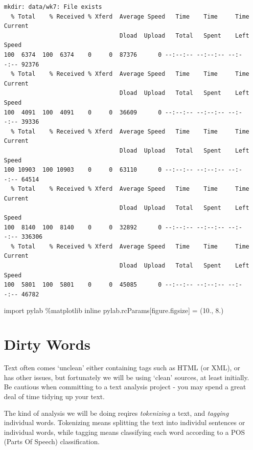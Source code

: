 \documentclass[
  letterpaper,
  DIV=11,
  numbers=noendperiod]{scrreprt}
\newenvironment{Shaded}{\begin{snugshade}}{\end{snugshade}}
\newcommand{\FloatTok}[1]{\textcolor[rgb]{0.68,0.00,0.00}{#1}}
\newcommand{\ImportTok}[1]{\textcolor[rgb]{0.00,0.46,0.62}{#1}}
\newcommand{\NormalTok}[1]{\textcolor[rgb]{0.00,0.23,0.31}{#1}}
\newcommand{\OperatorTok}[1]{\textcolor[rgb]{0.37,0.37,0.37}{#1}}
\newcommand{\StringTok}[1]{\textcolor[rgb]{0.13,0.47,0.30}{#1}}
\begin{document}
\begin{verbatim}
mkdir: data/wk7: File exists
  % Total    % Received % Xferd  Average Speed   Time    Time     Time  Current
                                 Dload  Upload   Total   Spent    Left  Speed
100  6374  100  6374    0     0  87376      0 --:--:-- --:--:-- --:--:-- 92376
  % Total    % Received % Xferd  Average Speed   Time    Time     Time  Current
                                 Dload  Upload   Total   Spent    Left  Speed
100  4091  100  4091    0     0  36609      0 --:--:-- --:--:-- --:--:-- 39336
  % Total    % Received % Xferd  Average Speed   Time    Time     Time  Current
                                 Dload  Upload   Total   Spent    Left  Speed
100 10903  100 10903    0     0  63110      0 --:--:-- --:--:-- --:--:-- 64514
  % Total    % Received % Xferd  Average Speed   Time    Time     Time  Current
                                 Dload  Upload   Total   Spent    Left  Speed
100  8140  100  8140    0     0  32892      0 --:--:-- --:--:-- --:--:-- 336306
  % Total    % Received % Xferd  Average Speed   Time    Time     Time  Current
                                 Dload  Upload   Total   Spent    Left  Speed
100  5801  100  5801    0     0  45085      0 --:--:-- --:--:-- --:--:-- 46782
\end{verbatim}

\begin{Shaded}
\begin{Highlighting}[]
\ImportTok{import}\NormalTok{ pylab}
\OperatorTok{\%}\NormalTok{matplotlib inline}
\NormalTok{pylab.rcParams[}\StringTok{\textquotesingle{}figure.figsize\textquotesingle{}}\NormalTok{] }\OperatorTok{=}\NormalTok{ (}\FloatTok{10.}\NormalTok{, }\FloatTok{8.}\NormalTok{)}
\end{Highlighting}
\end{Shaded}

\hypertarget{dirty-words}{%
\section{Dirty Words}\label{dirty-words}}

Text often comes `unclean' either containing tags such as HTML (or XML),
or has other issues, but fortunately we will be using `clean' sources,
at least initially. Be cautious when committing to a text analysis
project - you may spend a great deal of time tidying up your text.

The kind of analysis we will be doing reqires \emph{tokenizing} a text,
and \emph{tagging} individual words. Tokenizing means splitting the text
into individul sentences or individual words, while tagging means
classifying each word according to a POS (Parts Of Speech)
classification.
\end{document}

